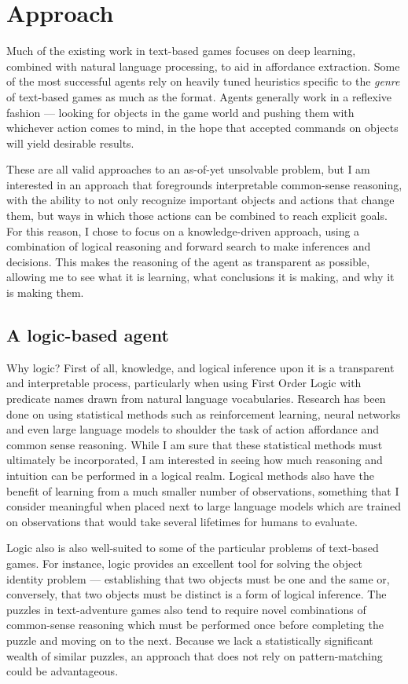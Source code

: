 \section{Approach}

Much of the existing work in text-based games focuses on deep learning,
combined with natural language processing, to aid in affordance
extraction. Some of the most successful agents rely on heavily tuned
heuristics specific to the \emph{genre} of text-based games as much as
the format. Agents generally work in a reflexive fashion --- looking for
objects in the game world and pushing them with whichever action comes
to mind, in the hope that accepted commands on objects will yield
desirable results.

These are all valid approaches to an as-of-yet unsolvable problem, but I
am interested in an approach that foregrounds interpretable common-sense
reasoning, with the ability to not only recognize important objects and
actions that change them, but ways in which those actions can be
combined to reach explicit goals. For this reason, I chose to focus on a
knowledge-driven approach, using a combination of logical reasoning and
forward search to make inferences and decisions. This makes the
reasoning of the agent as transparent as possible, allowing me to see
what it is learning, what conclusions it is making, and why it is making
them.

\subsection{A logic-based agent}

Why logic? First of all, knowledge, and logical inference upon it is a
transparent and interpretable process, particularly when using First
Order Logic with predicate names drawn from natural language
vocabularies. Research has been done on using statistical methods such
as reinforcement learning, neural networks and even large language
models to shoulder the task of action affordance and common sense
reasoning. While I am sure that these statistical methods must
ultimately be incorporated, I am interested in seeing how much reasoning
and intuition can be performed in a logical realm. Logical methods also
have the benefit of learning from a much smaller number of observations,
something that I consider meaningful when placed next to large language
models which are trained on observations that would take several
lifetimes for humans to evaluate.

Logic also is also well-suited to some of the particular problems of
text-based games. For instance, logic provides an excellent tool for solving
the object identity problem --- establishing that two objects must be
one and the same or, conversely, that two objects must be distinct is a
form of logical inference. The puzzles in text-adventure games also tend
to require novel combinations of common-sense reasoning which must be
performed once before completing the puzzle and moving on to the next.
Because we lack a statistically significant wealth of similar puzzles,
an approach that does not rely on pattern-matching could be
advantageous.

